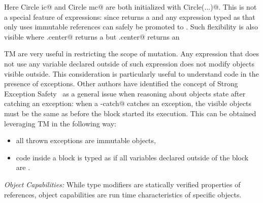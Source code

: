 Here \Q@imm Circle ic@ and \Q@mut Circle mc@ are both initialized with \Q@new Circle(...)@.
This is not a special feature of \Q@new@ expressions: since \Q@new@ returns a \Q@mut@ and any expression typed as \Q@mut@ that only uses immutable references can safely be promoted to \Q@imm@.
Such flexibility is also visible where \Q@rc.center@ returns a \Q@read@ but \Q@ic.center@ returns an \Q@imm@ %





\loseSpace

TM are very useful in restricting the scope of mutation. 
Any expression that does not use any \Q@mut@ 
variable declared outside of such expression does not modify objects visible outside. This consideration is particularly useful to understand code in the presence of exceptions. Other authors have identified the concept of Strong Exception Safety~\cite{Abrahams2000} as a general issue when reasoning about objects state after catching an exception:
when a \Q@try-catch@ catches an exception, the visible objects must be the same as before the \Q@try@ block started its execution.
This can be obtained leveraging TM in the following way:
\begin{itemize}
\item all thrown exceptions are immutable objects,
\item code inside a \Q@try@ block is typed as if all \Q@mut@ variables declared outside of the block are \Q@read@.
\end{itemize}

\loseSpace
\noindent\textit{Object Capabilities:}
While type modifiers are statically verified properties of references, object capabilities are run time characteristics of specific objects.

